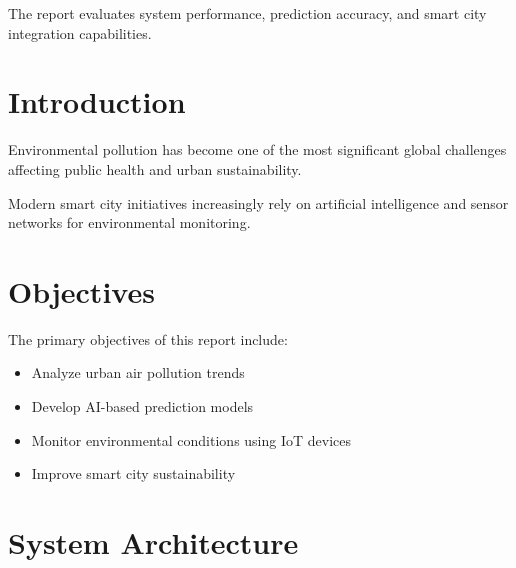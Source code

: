 \documentclass[12pt,a4paper]{article}
\begin{document}
	The report evaluates system performance, prediction accuracy, and smart city integration capabilities.
	
	\newpage
	
	
	\tableofcontents
	
	\newpage
	
	
	\section{Introduction}
	
	Environmental pollution has become one of the most significant global challenges affecting public health and urban sustainability.
	
	Modern smart city initiatives increasingly rely on artificial intelligence and sensor networks for environmental monitoring.
	
	
	\section{Objectives}
	
	The primary objectives of this report include:
	
	\begin{itemize}
		
		\item Analyze urban air pollution trends
		
		\item Develop AI-based prediction models
		
		\item Monitor environmental conditions using IoT devices
		
		\item Improve smart city sustainability
		
	\end{itemize}
	
	
	\section{System Architecture}
	
\end{document}
